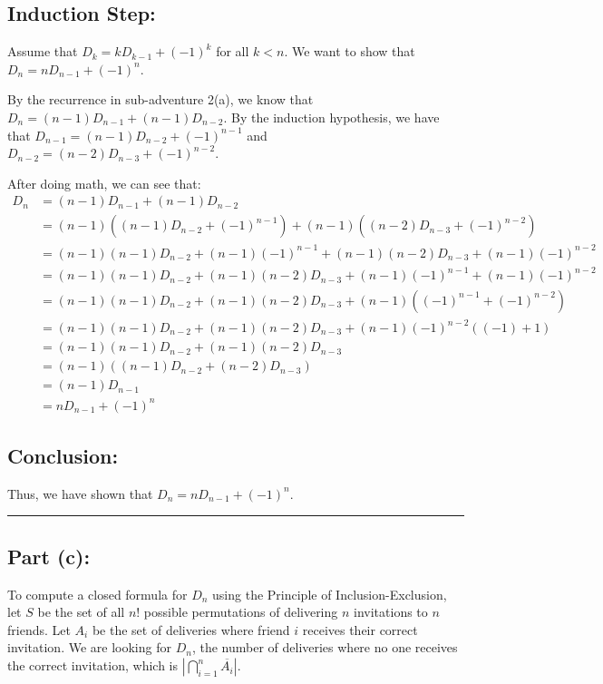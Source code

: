 \documentclass[answers]{exam}
\begin{document}
\begin{questions}
\begin{parts}
\begin{solution}
			\subsection*{Induction Step:}
			Assume that $D_k = kD_{k-1} +(-1)^k$ for all $k < n$.  We want to show that $D_n = nD_{n-1} +(-1)^n$.

			By the recurrence in sub-adventure 2(a), we know that $D_n = (n-1)D_{n-1} + (n-1)D_{n-2}$.  By the induction hypothesis, we have that $D_{n-1} = (n-1)D_{n-2} +(-1)^{n-1}$ and $D_{n-2} = (n-2)D_{n-3} +(-1)^{n-2}$.  
			
			After doing math, we can see that:
			\begin{align*}
				D_n &= (n-1)D_{n-1} + (n-1)D_{n-2} \\
				&= (n-1)((n-1)D_{n-2} +(-1)^{n-1}) + (n-1)((n-2)D_{n-3} +(-1)^{n-2}) \\
				&= (n-1)(n-1)D_{n-2} + (n-1)(-1)^{n-1} + (n-1)(n-2)D_{n-3} + (n-1)(-1)^{n-2} \\
				&= (n-1)(n-1)D_{n-2} + (n-1)(n-2)D_{n-3} + (n-1)(-1)^{n-1} + (n-1)(-1)^{n-2} \\
				&= (n-1)(n-1)D_{n-2} + (n-1)(n-2)D_{n-3} + (n-1)((-1)^{n-1} + (-1)^{n-2}) \\
				&= (n-1)(n-1)D_{n-2} + (n-1)(n-2)D_{n-3} + (n-1)(-1)^{n-2}((-1) + 1) \\
				&= (n-1)(n-1)D_{n-2} + (n-1)(n-2)D_{n-3} \\
				&= (n-1)((n-1)D_{n-2} + (n-2)D_{n-3}) \\
				&= (n-1)D_{n-1} \\
				&= nD_{n-1} +(-1)^n
			\end{align*}

			\subsection*{Conclusion:}

			Thus, we have shown that $D_n = nD_{n-1} +(-1)^n$.

			\noindent\rule{\textwidth}{0.4pt}

\subsection*{Part (c):}

            To compute a closed formula for $D_n$ using the Principle of Inclusion-Exclusion, let $S$ be the set of all $n!$ possible permutations of delivering $n$ invitations to $n$ friends. Let $A_i$ be the set of deliveries where friend $i$ receives their correct invitation. We are looking for $D_n$, the number of deliveries where no one receives the correct invitation, which is $|\bigcap_{i=1}^n \overline{A_i}|$.


\end{solution}
\end{parts}
\end{questions}
\end{document}
